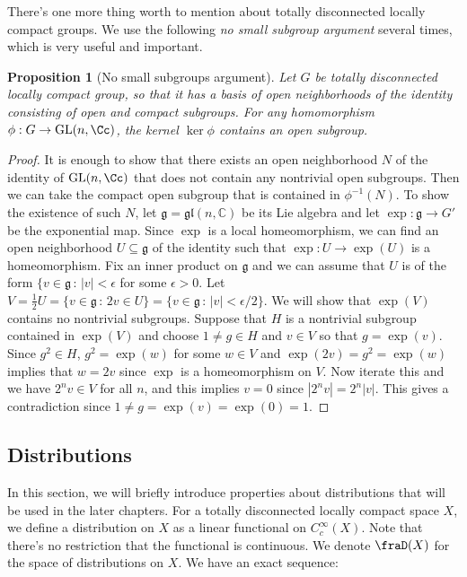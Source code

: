 \documentclass{article}
\newcommand{\GL}{\mathrm{GL}}
\newtheorem{proposition}{Proposition}[section]
\begin{document}
There's one more thing worth to mention about totally disconnected locally compact groups. We use the following \emph{no small subgroup argument} several times, which is very useful and important. 

\begin{proposition}[No small subgroups argument]
\label{nss}
Let $G$ be totally disconnected locally compact group, so that it has a basis of open neighborhoods of the identity consisting of open and compact subgroups. For any homomorphism $\phi:G \to \GL(n, \Cc)$, the kernel $\ker \phi$ contains an open subgroup. 
\end{proposition}
\begin{proof}
It is enough to show that there exists an open neighborhood $N$ of the identity of $\GL(n, \Cc)$ that does not contain any nontrivial open subgroups. Then we can take the compact open subgroup that is contained in $\phi^{-1}(N)$. 
To show the existence of such $N$, let $\mathfrak{g}= \mathfrak{gl}(n, \mathbb{C})$ be its Lie algebra and let $\exp : \mathfrak{g} \to G'$ be the exponential map. Since $\exp$ is a local homeomorphism, we can find an open neighborhood $U \subseteq \mathfrak{g}$ of the identity such that $\exp:U\to \exp(U)$ is a homeomorphism. 
Fix an inner product on $\mathfrak{g}$ and we can assume that $U$ is of the form $\{v\in \mathfrak{g}\,:\, |v| <\epsilon$ for some $\epsilon>0$. 
Let $V = \frac{1}{2} U = \{v\in \mathfrak{g}\,:\, 2v\in U\} = \{v\in \mathfrak{g}\,:\, |v| <\epsilon/2\}$. 
We will show that $\exp(V)$ contains no nontrivial subgroups. 
Suppose that $H$ is a nontrivial subgroup contained in  $\exp(V)$ and choose $1\neq g\in H$ and $v\in V$ so that $g = \exp(v)$.  Since $g^{2}\in H$, $g^{2} = \exp(w)$ for some $w\in V$ and $\exp(2v) = g^{2} = \exp(w)$ implies that $w = 2v$ since $\exp$ is a homeomorphism on $V$. 
Now iterate this and we have $2^{n}v\in V$ for all $n$, and this implies $v = 0$ since $|2^{n}v| = 2^{n}|v|$. This gives a contradiction since $1\neq g = \exp(v) = \exp(0) = 1$. 
\end{proof}

\subsection{Distributions}

In this section, we will briefly introduce properties about distributions that will be used in the later chapters. For a totally disconnected locally compact space $X$, we define a distribution on $X$ as a linear functional on $C_{c}^{\infty}(X)$. Note that there's no restriction that the functional is continuous. 
We denote $\fraD(X)$ for the space of distributions on $X$. 
We have an exact sequence:
\end{document}
